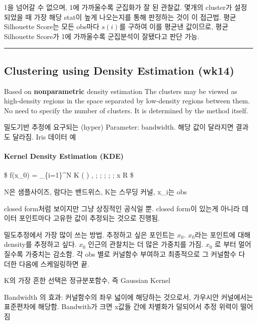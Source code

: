 \documentclass[
]{book}
\begin{document}
{{{1을 넘어갈 수 없으며, 1에 가까울수록 군집화가 잘 된 관찰값. 몇개의 cluster가 설정되었을 때 가장 해당 stat이 높게 나오는지를 통해 판정하는 것이 이 접근법. 평균 Silhouette Score는 모든 obs마다 \(s(i)\)를 구하여 이를 평균낸 값이므로, 평균 Silhouette Score가 1에 가까울수록 군집분석이 잘됐다고 판단 가능.

\begin{center}\rule{0.5\linewidth}{0.5pt}\end{center}

\hypertarget{clustering-using-density-estimation-wk14}{%
\subsection{Clustering using Density Estimation (wk14)}\label{clustering-using-density-estimation-wk14}}

Based on \textbf{nonparametric} density estimation
The clusters may be viewed as high-density regions in the space separated by low-density regions between them.
No need to specify the number of clusters. It is determined by the method itself.

밀도기반 추정에 요구되는 (hyper) Parameter: bandwidth. 해당 값이 달라지면 결과도 달라짐.
Iris 데이터 예

\hypertarget{kernel-density-estimation-kde}{%
\paragraph{Kernel Density Estimation (KDE)}\label{kernel-density-estimation-kde}}

\$
f(x\_0) =  \sum\_\{i=1\}\^{}N K \left(  \right) , ; ; ; ; ; x \in R
\$

N은 샘플사이즈, 람다는 밴드위스, K는 스무딩 커널, x\_i는 obs

closed form처럼 보이지만 그냥 상징적인 공식일 뿐. closed form이 있는게 아니라 데이터 포인트마다 고유한 값이 추정되는 것으로 진행됨.

밀도추정에서 가장 많이 쓰는 방법. 추정하고 싶은 포인트는 \(x_0\). \(x_0\)라는 포인트에 대해 density를 추정하고 싶다. \(x_0\) 인근의 관찰치는 더 많은 가중치를 가짐. \(x_0\) 로 부터 멀어질수록 가중치는 감소함. 각 obs 별로 커널함수 부여하고 최종적으로 그 커널함수 다 더한 다음에 스케일링하면 끝.

K의 가장 흔한 선택은 정규분포함수, 즉 Gaussian Kernel

Bandwidth 의 효과: 커널함수의 좌우 넓이에 해당하는 것으로서, 가우시안 커널에서는 표준편차에 해당함. Bandwith가 크면 x값들 간에 차별화가 덜되어서 추정 위력이 떨어짐

}}}
\end{document}
